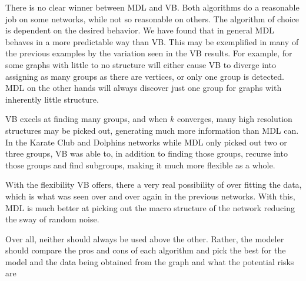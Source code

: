 There is no clear winner between MDL and VB. Both algorithms do a reasonable
job on some networks, while not so reasonable on others. The algorithm of
choice is dependent on the desired behavior. We have found that in general MDL
behaves in a more predictable way than VB. This may be exemplified in many of
the previous examples by the variation seen in the VB results. For example, for
some graphs with little to no structure will either cause VB to diverge into
assigning as many groups as there are vertices, or only one group is detected.
MDL on the other hands will always discover just one group for graphs with
inherently little structure.

VB excels at finding many groups, and when $k$ converges, many high resolution
structures may be picked out, generating much more information than MDL can. In
the Karate Club and Dolphins networks while MDL only picked out two or three
groups, VB was able to, in addition to finding those groups, recurse into those
groups and find subgroups, making it much more flexible as a whole.

With the flexibility VB offers, there a very real possibility of over fitting
the data, which is what was seen over and over again in the previous networks.
With this, MDL is much better at picking out the macro structure of the network
reducing the sway of random noise.

Over all, neither should always be used above the other. Rather, the modeler
should compare the pros and cons of each algorithm and pick the best for the
model and the data being obtained from the graph and what the potential risks
are


